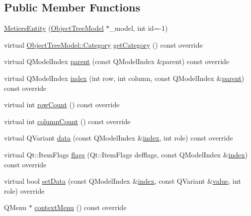 \subsection*{Public Member Functions}
\begin{DoxyCompactItemize}
\item 
\mbox{\hyperlink{classobjecttree_1_1_metiers_entity_a7599e8262e7e379ba32b88ba4d88f3f6}{Metiers\+Entity}} (\mbox{\hyperlink{class_object_tree_model}{Object\+Tree\+Model}} $\ast$\+\_\+model, int id=-\/1)
\item 
virtual \mbox{\hyperlink{class_object_tree_model_a379e9d6b0d381853785adf62095ba4e3}{Object\+Tree\+Model\+::\+Category}} \mbox{\hyperlink{classobjecttree_1_1_metiers_entity_ad05591af32392d00d9b8695bbb32b229}{get\+Category}} () const override
\item 
virtual Q\+Model\+Index \mbox{\hyperlink{classobjecttree_1_1_metiers_entity_aa7fde9b95a9b70ad5905a42adabc14e9}{parent}} (const Q\+Model\+Index \&parent) const override
\item 
virtual Q\+Model\+Index \mbox{\hyperlink{classobjecttree_1_1_metiers_entity_af72f3b12bc78b56985b6818dab24626b}{index}} (int row, int column, const Q\+Model\+Index \&\mbox{\hyperlink{classobjecttree_1_1_metiers_entity_aa7fde9b95a9b70ad5905a42adabc14e9}{parent}}) const override
\item 
virtual int \mbox{\hyperlink{classobjecttree_1_1_metiers_entity_abf06cd3029120d0ac3f05ceb14951488}{row\+Count}} () const override
\item 
virtual int \mbox{\hyperlink{classobjecttree_1_1_metiers_entity_afbf2645b47ca0ecf76d0ad022f2cb1e9}{column\+Count}} () const override
\item 
virtual Q\+Variant \mbox{\hyperlink{classobjecttree_1_1_metiers_entity_a87a099389bb77e61ab39707ea1ea9de7}{data}} (const Q\+Model\+Index \&\mbox{\hyperlink{classobjecttree_1_1_metiers_entity_af72f3b12bc78b56985b6818dab24626b}{index}}, int role) const override
\item 
virtual Qt\+::\+Item\+Flags \mbox{\hyperlink{classobjecttree_1_1_metiers_entity_aedf45a5092b676dee0b987a5ec6384d4}{flags}} (Qt\+::\+Item\+Flags defflags, const Q\+Model\+Index \&\mbox{\hyperlink{classobjecttree_1_1_metiers_entity_af72f3b12bc78b56985b6818dab24626b}{index}}) const override
\item 
virtual bool \mbox{\hyperlink{classobjecttree_1_1_metiers_entity_a35236f555919a51a3f92518279fd41ca}{set\+Data}} (const Q\+Model\+Index \&\mbox{\hyperlink{classobjecttree_1_1_metiers_entity_af72f3b12bc78b56985b6818dab24626b}{index}}, const Q\+Variant \&\mbox{\hyperlink{diffusion_8cpp_a4b41795815d9f3d03abfc739e666d5da}{value}}, int role) override
\item 
Q\+Menu $\ast$ \mbox{\hyperlink{classobjecttree_1_1_metiers_entity_a1cb1d02a1cf0d048589b2b6844d971e8}{context\+Menu}} () const override
\end{DoxyCompactItemize}
